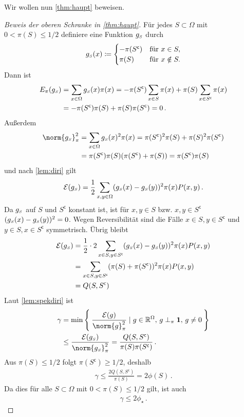 \documentclass[ngerman,a4paper,11pt]{scrartcl}
\newcommand{\stcomp}[1]{{#1}^{\mathsf{c}}} %
\newcommand{\diri}{\mathcal{E}}
\newcommand{\RR}{\mathbb{R}}
\newcommand{\smallS}{{\mathchoice{}{}{\scriptscriptstyle}{}S}}
\begin{document}
Wir wollen nun \cref{thm:haupt} beweisen.
\begin{proof}[Beweis der oberen Schranke in \cref{thm:haupt}]
 Für jedes $S\subset\Omega$ mit $0<\pi(S)\leq 1/2$ definiere eine Funktion $g_\smallS$ durch 
 \begin{equation*}
  g_\smallS(x)\coloneqq
  \begin{cases}
   -\pi(\stcomp{S})&\text{für }x\in S, \\
   \pi(S)&\text{für }x\notin S.
  \end{cases}
 \end{equation*}
 Dann ist
 \begin{align*}
  E_\pi(g_\smallS)&=\sum_{x\in\Omega}g_\smallS(x)\pi(x)=-\pi(\stcomp{S})\sum_{x\in S}\pi(x)+\pi(S)\sum_{x\in\stcomp{S}}\pi(x) \\
  &=-\pi(\stcomp{S})\pi(S)+\pi(S)\pi(\stcomp{S})=0\, .
 \end{align*}
 Außerdem
 \begin{align*}
  \norm{g_\smallS}_\pi^2&=\sum_{x\in\Omega}g_\smallS(x)^2\pi(x)=\pi(\stcomp{S})^2\pi(S)+\pi(S)^2\pi(\stcomp{S}) \\
  &=\pi(\stcomp{S})\pi(S)(\pi(\stcomp{S})+\pi(S))=\pi(\stcomp{S})\pi(S)
 \end{align*}
 und nach \cref{lem:diri} gilt
 \begin{align*}
  \diri(g_\smallS)=\frac{1}{2}\sum_{x,y\in\Omega}(g_\smallS(x)-g_\smallS(y))^2\pi(x)P(x,y) \, .
 \end{align*}
 Da $g_\smallS$ auf $S$ und $\stcomp{S}$ konstant ist, ist für $x,y\in S$ bzw.
 $x,y\in\stcomp{S}$ $(g_\smallS(x)-g_\smallS(y))^2=0$. Wegen Reversibilität sind die Fälle
 $x\in S,y\in\stcomp{S}$ und $y\in S,x\in\stcomp{S}$ symmetrisch. Übrig bleibt
 \begin{align*}
  \diri(g_\smallS)&=\frac{1}{2}\cdot 2\sum_{x\in S,y\in\stcomp{S}}(g_\smallS(x)-g_\smallS(y))^2\pi(x)P(x,y) \\
  &=\sum_{x\in S,y\in\stcomp{S}}(\pi(S)+\pi(\stcomp{S}))^2\pi(x)P(x,y) \\
  &=Q(S,\stcomp{S})
 \end{align*}
 Laut \cref{lem:spekdiri} ist
 \begin{align*}
  \gamma&=\min\Set{\frac{\diri(g)}{\norm{g}_\pi^2}\mid g\in\RR^\Omega,\, g\perp_\pi\mathbf{1},\, g\neq 0} \\
  &\leq\frac{\diri(g_\smallS)}{\norm{g_\smallS}_\pi^2}=\frac{Q(S,\stcomp{S})}{\pi(S)\pi(\stcomp{S})} \, .
 \end{align*}
 Aus $\pi(S)\leq 1/2$ folgt $\pi(\stcomp{S})\geq 1/2$, deshalb
 \begin{align*}
  \gamma\leq\frac{2Q(S,\stcomp{S})}{\pi(S)}=2\phi(S) \, .
 \end{align*}
 Da dies für alle $S\subset\Omega$ mit $0<\pi(S)\leq 1/2$ gilt, ist auch
 \begin{align*}
  \gamma\leq 2\phi_\star\, . 
 \end{align*}
\end{proof}
\end{document}
